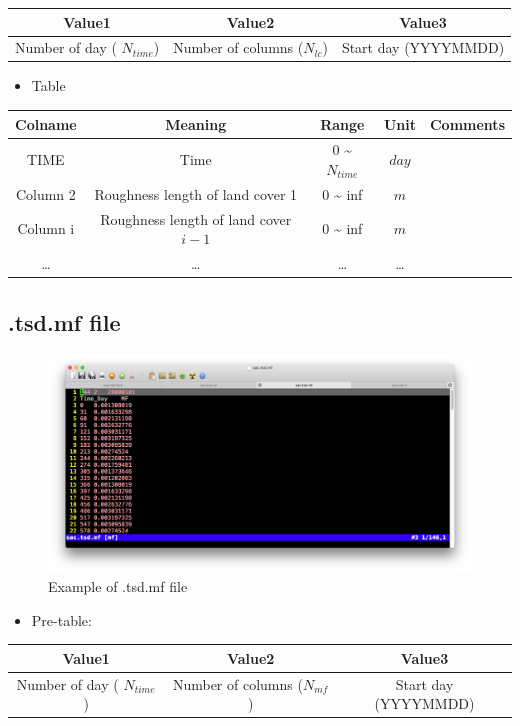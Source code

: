 \documentclass[]{scrbook}
\providecommand{\tightlist}{%
  \setlength{\itemsep}{0pt}\setlength{\parskip}{0pt}}
\begin{document}
\begin{longtable}[]{@{}ccc@{}}
\toprule
Value1 & Value2 & Value3\tabularnewline
\midrule
\endhead
Number of day ( \(N_{time}\)) & Number of columns (\(N_{lc}\)) & Start
day (YYYYMMDD)\tabularnewline
\bottomrule
\end{longtable}

\begin{itemize}
\tightlist
\item
  Table
\end{itemize}

\begin{longtable}[]{@{}ccccc@{}}
\toprule
Colname & Meaning & Range & Unit & Comments\tabularnewline
\midrule
\endhead
TIME & Time & 0 \textasciitilde{} \(N_{time}\) & \(day\)
&\tabularnewline
Column 2 & Roughness length of land cover 1 & 0 \textasciitilde{} inf &
\(m\) &\tabularnewline
Column i & Roughness length of land cover \(i-1\) & 0 \textasciitilde{}
inf & \(m\) &\tabularnewline
\ldots{} & \ldots{} & \ldots{} & \ldots{} &\tabularnewline
\bottomrule
\end{longtable}

\subsection{.tsd.mf file}\label{tsd.mf-file}

\begin{figure}
\centering
\includegraphics{Fig/IO/tsd.mf.png}
\caption{Example of .tsd.mf file}
\end{figure}

\begin{itemize}
\tightlist
\item
  Pre-table:
\end{itemize}

\begin{longtable}[]{@{}ccc@{}}
\toprule
Value1 & Value2 & Value3\tabularnewline
\midrule
\endhead
Number of day ( \(N_{time}\)) & Number of columns (\(N_{mf}\)) & Start
day (YYYYMMDD)\tabularnewline
\bottomrule
\end{longtable}
\end{document}
